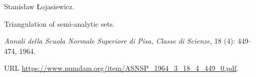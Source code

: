Stanis{\l}aw \L{}ojasiewicz.

\newblock Triangulation of semi-analytic sets.

\newblock \emph{Annali della Scuola Normale Superiore di Pisa, Classe di
  Scienze}, 18 (4): 449--474, 1964.

\newblock URL \url{https://www.numdam.org/item/ASNSP_1964_3_18_4_449_0.pdf}.
